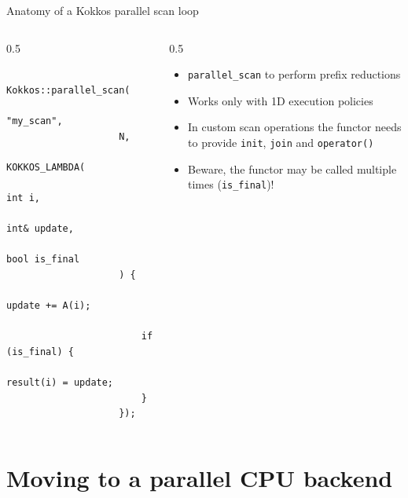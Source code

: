 \documentclass[
    aspectratio=169,
]{beamer}
\begin{document}
\begin{frame}[fragile]{Anatomy of a Kokkos parallel scan loop}
    \begin{columns}
        \begin{column}{0.5\linewidth}
            \begin{verbatim}
                Kokkos::parallel_scan(
                    "my_scan",
                    N,
                    KOKKOS_LAMBDA(
                        int i,
                        int& update,
                        bool is_final
                    ) {
                        update += A(i);

                        if (is_final) {
                            result(i) = update;
                        }
                    });
            \end{verbatim}
        \end{column}
        \begin{column}{0.5\linewidth}
            \begin{itemize}
                \item \texttt{parallel_scan} to perform prefix reductions
                \item Works only with 1D execution policies
                \item In custom scan operations the functor needs to provide \texttt{init}, \texttt{join} and \texttt{operator()}
                \item Beware, the functor may be called multiple times (\texttt{is\_final})!
            \end{itemize}
        \end{column}
    \end{columns}
\end{frame}

\section{Moving to a parallel CPU backend}
\end{document}
